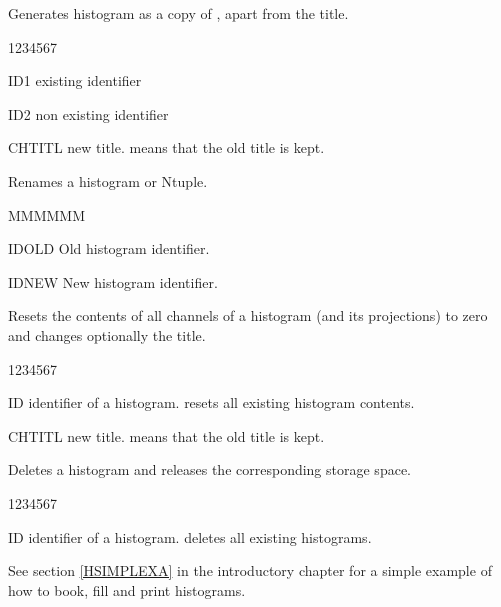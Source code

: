 
\Action Generates histogram 
as a copy of , apart from the title.

\Idesc
\begin{DLtt}{1234567}
\item[ID1] existing identifier
\item[ID2] non existing identifier
\item[CHTITL] new title.  means that the old title is kept.
\end{DLtt}
 
 
\Action Renames a histogram or Ntuple.

\Idesc
\begin{DLtt}{MMMMMM}
\item[IDOLD]  Old histogram identifier.
\item[IDNEW]  New histogram identifier.
\end{DLtt}

 
\Action Resets the contents of all channels of a histogram
(and its projections) to zero and changes optionally the title.

\Idesc
\begin{DLtt}{1234567}
\item[ID] identifier of a histogram.
           resets all existing histogram contents.
\item[CHTITL] new title.
           means that the old title is kept.
\end{DLtt}
 
 
\Action Deletes a histogram and releases the corresponding storage space.
 
\Idesc
\begin{DLtt}{1234567}
\item[ID] identifier of a histogram.  deletes all existing histograms.
\end{DLtt}

 
See section \ref{HSIMPLEXA} in the introductory chapter for a simple
example of how to book, fill and print histograms.

\endinput
